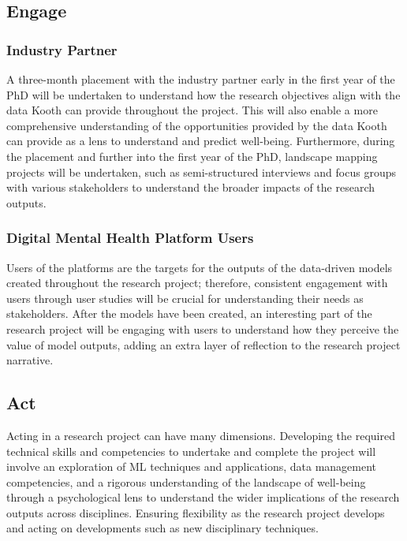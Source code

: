 \documentclass[12pt]{article}
\begin{document}
\subsection{Engage}
\subsubsection{Industry Partner}
A three-month placement with the industry partner early in the first year of the PhD will be undertaken to understand how the research objectives align with the data Kooth can provide throughout the project. This will also enable a more comprehensive understanding of the opportunities provided by the data Kooth can provide as a lens to understand and predict well-being. Furthermore, during the placement and further into the first year of the PhD, landscape mapping projects will be undertaken, such as semi-structured interviews and focus groups with various stakeholders to understand the broader impacts of the research outputs.   
\subsubsection{Digital Mental Health Platform Users}
Users of the platforms are the targets for the outputs of the data-driven models created throughout the research project; therefore, consistent engagement with users through user studies will be crucial for understanding their needs as stakeholders. After the models have been created, an interesting part of the research project will be engaging with users to understand how they perceive the value of model outputs, adding an extra layer of reflection to the research project narrative.
\subsection{Act}
Acting in a research project can have many dimensions. Developing the required technical skills and competencies to undertake and complete the project will involve an exploration of ML techniques and applications, data management competencies, and a rigorous understanding of the landscape of well-being through a psychological lens to understand the wider implications of the research outputs across disciplines. Ensuring flexibility as the research project develops and acting on developments such as new disciplinary techniques.


\printbibliography
\appendix
\end{document}
